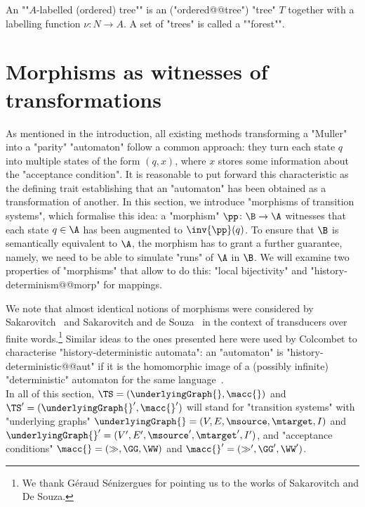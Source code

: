 \documentclass{theoretics}
\begin{document}
\AP An ""$A$-labelled (ordered) tree"" is an ("ordered@@tree") "tree" $T$ together with a labelling function $\nu \colon N \to A$.
\AP A set of "trees" is called a ""forest"".

 	
	\section{Morphisms as witnesses of transformations}\label{section:morphisms}
	As mentioned in the introduction, all existing methods transforming a "Muller" into a "parity" "automaton" follow a common approach: they turn each state $q$ into multiple states of the form $(q,x)$, where $x$ stores some information about the "acceptance condition". 
It is reasonable to put forward this characteristic as the defining trait establishing that an "automaton" has been obtained as a transformation of another.
In this section, we introduce "morphisms of transition systems", which formalise this idea: a "morphism" $\pp \colon \B\to \A$ witnesses that each state $q\in \A$ has been augmented to $\inv{\pp}(q)$. To ensure that $\B$ is semantically equivalent to $\A$, the morphism has to grant a further guarantee, namely, we need to be able to simulate "runs" of $\A$ in $\B$. We will examine two properties of "morphisms" that allow to do this: "local bijectivity" and "history-determinism@@morp" for mappings.

We note that almost identical notions of morphisms were considered by Sakarovitch~\cite[Section~2]{Sakarovitch98Hidden} and Sakarovitch and de Souza~\cite[Section~2.5]{SS10LexDecomposition} in the context of transducers over finite words.\footnote{We thank Géraud Sénizergues for pointing us to the works of Sakarovitch and De Souza.}
Similar ideas to the ones presented here were used by Colcombet to characterise "history-deterministic automata": an "automaton" is "history-deterministic@@aut" if it is the homomorphic image of a (possibly infinite) "deterministic" automaton for the same language~\cite[Definition~13]{Colcombet2012FormsND}.\\



In all of this section, $\TS = (\underlyingGraph{}, \macc{})$ and $\TS' = (\underlyingGraph{}', \macc{}')$ will stand for "transition systems" with "underlying graphs" $\underlyingGraph{} =(V ,E , \msource , \mtarget, I)$ and $\underlyingGraph{}' =(V' ,E' , \msource' , \mtarget', I')$, and "acceptance conditions" $\macc{} = (\gg, \GG, \WW)$ and  $\macc{}' = (\gg', \GG', \WW')$.
\end{document}
